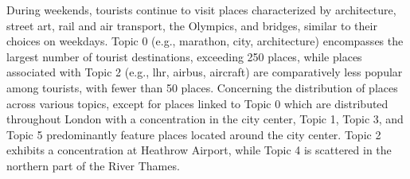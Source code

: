 \documentclass{article}
\theoremstyle{definition}
\theoremstyle{remark}
\begin{document}
During weekends, tourists continue to visit places characterized by architecture, street art, rail and air transport, the Olympics, and bridges, similar to their choices on weekdays. Topic 0 (e.g., marathon, city, architecture) encompasses the largest number of tourist destinations, exceeding 250 places, while places associated with Topic 2 (e.g., lhr, airbus, aircraft) are comparatively less popular among tourists, with fewer than 50 places. Concerning the distribution of places across various topics, except for places linked to Topic 0 which are distributed throughout London with a concentration in the city center, Topic 1, Topic 3, and Topic 5 predominantly feature places located around the city center. Topic 2 exhibits a concentration at Heathrow Airport, while Topic 4 is scattered in the northern part of the River Thames.
\end{document}
